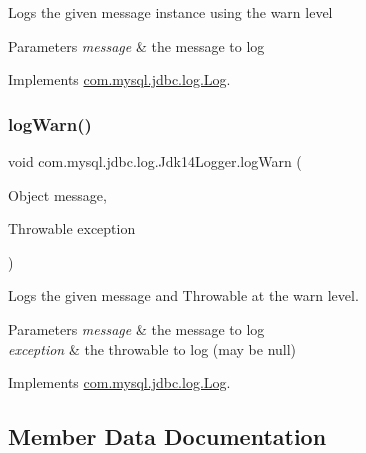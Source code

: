Logs the given message instance using the \textquotesingle{}warn\textquotesingle{} level


\begin{DoxyParams}{Parameters}
{\em message} & the message to log \\
\hline
\end{DoxyParams}


Implements \mbox{\hyperlink{interfacecom_1_1mysql_1_1jdbc_1_1log_1_1_log_aa37a430b8cd7d66bb3ff46cb87e060f3}{com.\+mysql.\+jdbc.\+log.\+Log}}.

\mbox{\label{classcom_1_1mysql_1_1jdbc_1_1log_1_1_jdk14_logger_a7fb95a94f7be44f70e933e99e822bf02}} 
\subsubsection{\texorpdfstring{log\+Warn()}{logWarn()}\hspace{0.1cm}{\footnotesize\ttfamily [2/2]}}
{\footnotesize\ttfamily void com.\+mysql.\+jdbc.\+log.\+Jdk14\+Logger.\+log\+Warn (\begin{DoxyParamCaption}\item[{Object}]{message,  }\item[{Throwable}]{exception }\end{DoxyParamCaption})}

Logs the given message and Throwable at the \textquotesingle{}warn\textquotesingle{} level.


\begin{DoxyParams}{Parameters}
{\em message} & the message to log \\
\hline
{\em exception} & the throwable to log (may be null) \\
\hline
\end{DoxyParams}


Implements \mbox{\hyperlink{interfacecom_1_1mysql_1_1jdbc_1_1log_1_1_log_a04d875e95d9a1d35f305da5ca20219a3}{com.\+mysql.\+jdbc.\+log.\+Log}}.



\subsection{Member Data Documentation}
\mbox{\label{classcom_1_1mysql_1_1jdbc_1_1log_1_1_jdk14_logger_adc3897dd5e671b9f64375ebf1478998a}} 
